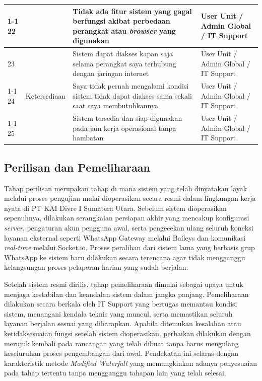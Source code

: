 \begin{longtable}{|p{}|p{}|p{}|p{}|}
    \cline{1-1}\cline{3-4}
    22 & & Tidak ada fitur sistem yang gagal berfungsi akibat perbedaan perangkat atau \textit{browser} yang digunakan & User Unit / Admin Global / IT Support \\
    \hline
    23 & \multirow{3}{=}{Ketersediaan} & Sistem dapat diakses kapan saja selama perangkat saya terhubung dengan jaringan internet & User Unit / Admin Global / IT Support \\
    \cline{1-1}\cline{3-4}
    24 & & Saya tidak pernah mengalami kondisi sistem tidak dapat diakses sama sekali saat saya membutuhkannya & User Unit / Admin Global / IT Support \\
    \cline{1-1}\cline{3-4}
    25 & & Sistem tersedia dan siap digunakan pada jam kerja operasional tanpa hambatan & User Unit / Admin Global / IT Support \\
    \hline
\end{longtable}

\subsection{Perilisan dan Pemeliharaan} \label{III.Perilisan2}
Tahap perilisan merupakan tahap di mana sistem yang telah dinyatakan layak melalui proses pengujian mulai dioperasikan secara resmi dalam lingkungan kerja nyata di PT KAI Divre I Sumatera Utara. Sebelum sistem dioperasikan sepenuhnya, dilakukan serangkaian persiapan akhir yang mencakup konfigurasi \textit{server}, pengaturan akun pengguna awal, serta pengecekan ulang seluruh koneksi layanan eksternal seperti WhatsApp Gateway melalui Baileys dan komunikasi \textit{real-time} melalui Socket.io. Proses peralihan dari sistem lama yang berbasis grup WhatsApp ke sistem baru dilakukan secara terencana agar tidak mengganggu kelangsungan proses pelaporan harian yang sudah berjalan. \par

Setelah sistem resmi dirilis, tahap pemeliharaan dimulai sebagai upaya untuk menjaga kestabilan dan keandalan sistem dalam jangka panjang. Pemeliharaan dilakukan secara berkala oleh IT Support yang bertugas memantau kondisi sistem, menangani kendala teknis yang muncul, serta memastikan seluruh layanan berjalan sesuai yang diharapkan. Apabila ditemukan kesalahan atau ketidaksesuaian fungsi setelah sistem dioperasikan, perbaikan dilakukan dengan merujuk kembali pada rancangan yang telah dibuat tanpa harus mengulang keseluruhan proses pengembangan dari awal. Pendekatan ini selaras dengan karakteristik metode \textit{Modified Waterfall} yang memungkinkan adanya penyesuaian pada tahap tertentu tanpa mengganggu tahapan lain yang telah selesai. \par

